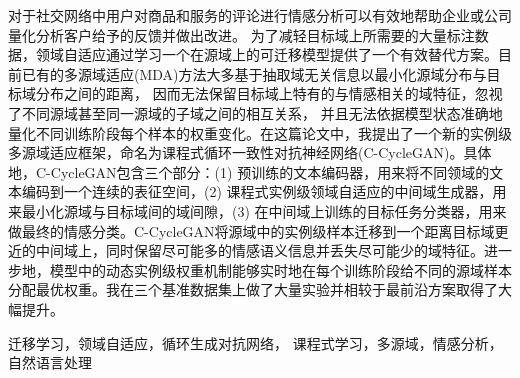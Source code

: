 

\begin{zhaiyao}
    对于社交网络中用户对商品和服务的评论进行情感分析可以有效地帮助企业或公司量化分析客户给予的反馈并做出改进。 为了减轻目标域上所需要的大量标注数据，领域自适应通过学习一个在源域上的可迁移模型提供了一个有效替代方案。目前已有的多源域适应(MDA)方法大多基于抽取域无关信息以最小化源域分布与目标域分布之间的距离， 因而无法保留目标域上特有的与情感相关的域特征，忽视了不同源域甚至同一源域的子域之间的相互关系， 并且无法依据模型状态准确地量化不同训练阶段每个样本的权重变化。在这篇论文中，我提出了一个新的实例级多源域适应框架，命名为课程式循环一致性对抗神经网络(C-CycleGAN)。具体地，C-CycleGAN包含三个部分：(1) 预训练的文本编码器，用来将不同领域的文本编码到一个连续的表征空间，(2) 课程式实例级领域自适应的中间域生成器，用来最小化源域与目标域间的域间隙，(3) 在中间域上训练的目标任务分类器，用来做最终的情感分类。C-CycleGAN将源域中的实例级样本迁移到一个距离目标域更近的中间域上，同时保留尽可能多的情感语义信息并丢失尽可能少的域特征。进一步地，模型中的动态实例级权重机制能够实时地在每个训练阶段给不同的源域样本分配最优权重。我在三个基准数据集上做了大量实验并相较于最前沿方案取得了大幅提升。
\end{zhaiyao}




\begin{guanjianci}
    迁移学习，领域自适应，循环生成对抗网络， 课程式学习，多源域，情感分析，自然语言处理
\end{guanjianci}



